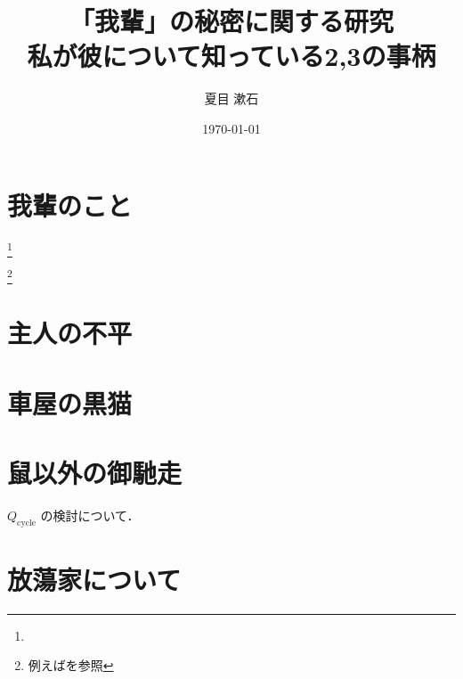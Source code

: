 \documentclass[10pt,oneside,fleqn]{scrartcl}
\author{夏目 漱石}
\date{\today}
\title{「我輩」の秘密に関する研究\\\medskip
  \large 私が彼について知っている2,3の事柄}
\begin{document}
\maketitle

\section{我輩のこと}
\label{sec:org7cb4306}
 \footnote{}

 \footnote{例えば\cite{吉田2006,竹内1963,杉浦1980,杉浦1985,田中2006}を参照}

\section{主人の不平}
\label{sec:orgfd1a490}

\begin{figure}[htbp] %
  \centering
  \myGraph[1]{} %
\end{figure}

\section{車屋の黒猫}
\label{sec:org4ae49ab}

\begin{figure*} %
  \centering
\end{figure*}

\section{鼠以外の御馳走}
\label{sec:orge2de146}

\begin{marginfigure}
  \centering
  \myGraph*{} %
  \caption{$Q_{\mathrm{cycle}}$ の検討について．
    \label{fig:4}}
\end{marginfigure}

\section{放蕩家について}
\label{sec:org3eba1ea}

\begin{otherlanguage}{english}
  \printbibliography[title=参考文献]
\end{otherlanguage}
\end{document}
